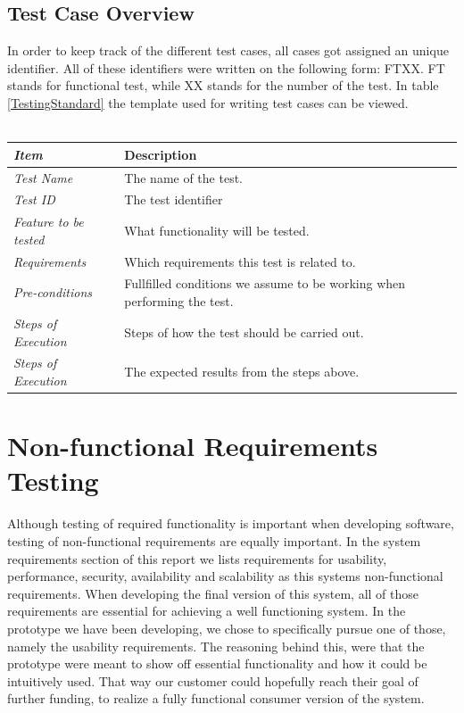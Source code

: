 \subsection{Test Case Overview}
\label{subsec:TestingSystemOverview}
In order to keep track of the different test cases, all cases got assigned an unique identifier. All of these identifiers were written on the following form: FTXX. FT stands for functional test, while XX stands for the number of the test. In table \ref{TestingStandard} the template used for writing test cases can be viewed. \\ \\ 
%
\begin{minipage}{\linewidth}
\setlength{\tabcolsep}{15pt}
\centering
{}
\begin{tabular}{ |l|p{70mm}| }
	\hline
	\it{\cellcolor{gray!25}Item} & {\cellcolor{gray!25} Description } \\
	\hline
	\it{\cellcolor{gray!25}Test Name } & The name of the test.  \\ \hline
	\it{\cellcolor{gray!25}Test ID} & The test identifier  \\ \hline
	\it{\cellcolor{gray!25}Feature to be tested} & What functionality will be tested.  \\ \hline
	\it{\cellcolor{gray!25}Requirements} & Which requirements this test is related to.  \\ \hline
	\it{\cellcolor{gray!25}Pre-conditions} & Fullfilled conditions we assume to be working when performing the test.  \\ \hline
	\it{\cellcolor{gray!25}Steps of Execution} & Steps of how the test should be carried out.  \\ \hline
	\it{\cellcolor{gray!25}Steps of Execution} & The expected results from the steps above.  \\
	\hline
\end{tabular}
\end{minipage}

\section{Non-functional Requirements Testing}
\label{sec:TestingNRT}

Although testing of required functionality is important when developing software, testing of non-functional requirements are equally important. In the system requirements section of this report we lists requirements for usability, performance, security, availability and scalability as this systems non-functional requirements. When developing the final version of this system, all of those requirements are essential for achieving a well functioning system. In the prototype we have been developing, we chose to specifically pursue one of those, namely the usability requirements. The reasoning behind this, were that the prototype were meant to show off essential functionality and how it could be intuitively used. That way our customer could hopefully reach their goal of further funding, to realize a fully functional consumer version of the system. 


